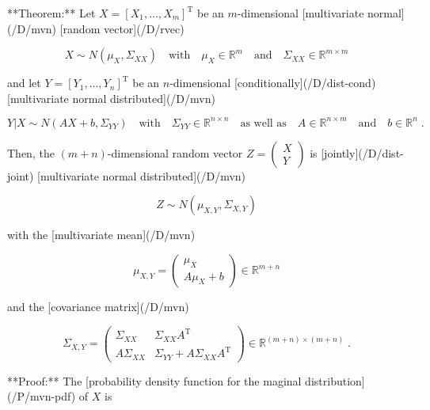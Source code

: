\documentclass[a4paper,12pt]{article}
\begin{document}
**Theorem:** Let $X = [X_1,\ldots,X_m]^\mathrm{T}$ be an $m$-dimensional [multivariate normal](/D/mvn) [random vector](/D/rvec)

\begin{equation} \label{eq:mvn-marg}
X \sim N(\mu_X, \Sigma_{XX})
\quad \mbox{with} \quad
\mu_X \in \mathbb{R}^m
\quad \mbox{and} \quad
\Sigma_{XX} \in \mathbb{R}^{m \times m}
\end{equation}

and let $Y = [Y_1,\ldots,Y_n]^\mathrm{T}$ be an $n$-dimensional [conditionally](/D/dist-cond) [multivariate normal distributed](/D/mvn)

\begin{equation} \label{eq:mvn-cond}
Y|X \sim N(AX+b, \Sigma_{YY})
\quad \mbox{with} \quad
\Sigma_{YY} \in \mathbb{R}^{n \times n}
\quad \mbox{as well as} \quad
A \in \mathbb{R}^{n \times m}
\quad \mbox{and} \quad
b \in \mathbb{R}^n \; .
\end{equation}

Then, the $(m+n)$-dimensional random vector $Z = \begin{pmatrix} X \\ Y \end{pmatrix}$ is [jointly](/D/dist-joint) [multivariate normal distributed](/D/mvn)

\begin{equation} \label{eq:mvn-joint}
Z \sim N(\mu_{X,Y}, \Sigma_{X,Y})
\end{equation}

with the [multivariate mean](/D/mvn)

\begin{equation} \label{eq:mvn-joint-mean}
\mu_{X,Y} = \begin{pmatrix} \mu_X \\ A\mu_X + b \end{pmatrix} \in \mathbb{R}^{m+n}
\end{equation}

and the [covariance matrix](/D/mvn)

\begin{equation} \label{eq:mvn-joint-cov}
\Sigma_{X,Y} =
\begin{pmatrix}
\Sigma_{XX}   & \Sigma_{XX} A^\mathrm{T} \\
A \Sigma_{XX} & \Sigma_{YY} + A \Sigma_{XX} A^\mathrm{T}
\end{pmatrix} \in \mathbb{R}^{(m+n) \times (m+n)} \; .
\end{equation}


**Proof:** The [probability density function for the maginal distribution](/P/mvn-pdf) of $X$ is
\end{document}
